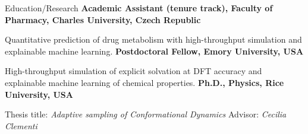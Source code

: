 \begin{rubric}{Education/Research}
%
  \textbf{Academic Assistant (tenure track), Faculty of Pharmacy, Charles University, Czech Republic}
  \par Quantitative prediction of drug metabolism with high-throughput simulation and explainable machine learning. 
\entry*[2020 -- 2022]%
  \textbf{Postdoctoral Fellow, Emory University, USA}
  \par High-throughput simulation of explicit solvation at DFT accuracy and explainable machine learning of chemical properties. 
\entry*[2014 -- 2020]%
  \textbf{Ph.D., Physics, Rice University, USA}
  \par Thesis title: \emph{Adaptive sampling of Conformational Dynamics} Advisor: \emph{Cecilia Clementi}
\end{rubric}
